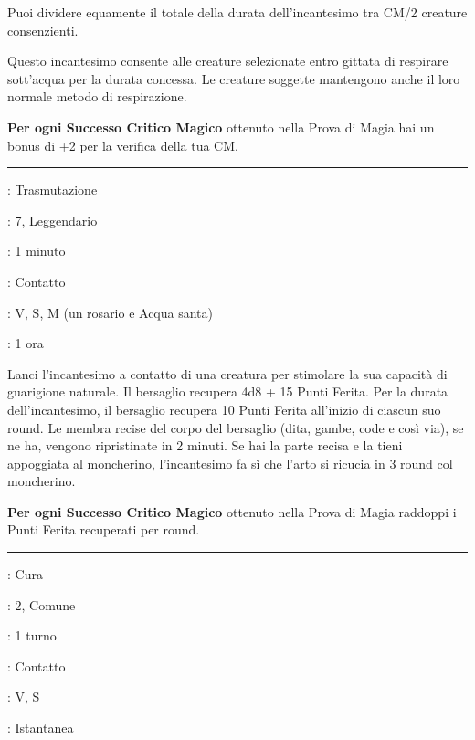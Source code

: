 \begin{multicols}{2}
Puoi dividere equamente il totale della durata dell'incantesimo tra CM/2 creature consenzienti.

Questo incantesimo consente  alle creature selezionate entro gittata di respirare sott'acqua per la durata concessa. Le creature soggette mantengono anche il loro normale metodo di respirazione.

\textbf{Per ogni Successo Critico Magico} ottenuto nella Prova di Magia hai un bonus di +2 per la verifica della tua CM.

\smallskip\noindent\rule{\linewidth}{2pt} \hypertarget{Rigenerazione}{}\smallskip{}
\noindent
\begin{description}[noitemsep, topsep=0pt, parsep=0pt, partopsep=0pt, leftmargin=0cm, labelwidth=2.8cm]
	\item[\textbf{Lista di Magia}]: Trasmutazione
	\item[\textbf{Livello}]: 7, Leggendario
	\item[\textbf{T. di Lancio}]: 1 minuto
	\item[\textbf{Gittata}]: Contatto
	\item[\textbf{Componenti}]: V, S, M (un rosario e Acqua santa)
	\item[\textbf{Durata}]: 1 ora
\end{description}

Lanci l'incantesimo a contatto di una creatura per stimolare la sua capacità di guarigione naturale. Il bersaglio recupera 4d8 + 15 Punti Ferita. Per la durata dell'incantesimo, il bersaglio recupera 10 Punti Ferita all'inizio di ciascun suo round. Le membra recise del corpo del bersaglio (dita, gambe, code e così via), se ne ha, vengono ripristinate in 2 minuti. Se hai la parte recisa e la tieni appoggiata al moncherino, l'incantesimo fa sì che l'arto si ricucia in 3 round col moncherino.

\textbf{Per ogni Successo Critico Magico} ottenuto nella Prova di Magia raddoppi i Punti Ferita recuperati per round.

\smallskip\noindent\rule{\linewidth}{2pt} \hypertarget{Rimuovi Malattia}{}\smallskip{}
\label{rimuovimalattie}\hypertarget{rimuovimalattie}{}
\noindent
\begin{description}[noitemsep, topsep=0pt, parsep=0pt, partopsep=0pt, leftmargin=0cm, labelwidth=2.8cm]
	\item[\textbf{Lista di Magia}]: Cura
	\item[\textbf{Livello}]: 2, Comune
	\item[\textbf{T. di Lancio}]: 1 turno
	\item[\textbf{Gittata}]: Contatto
	\item[\textbf{Componenti}]: V, S
	\item[\textbf{Durata}]: Istantanea
\end{description}


\end{multicols}
